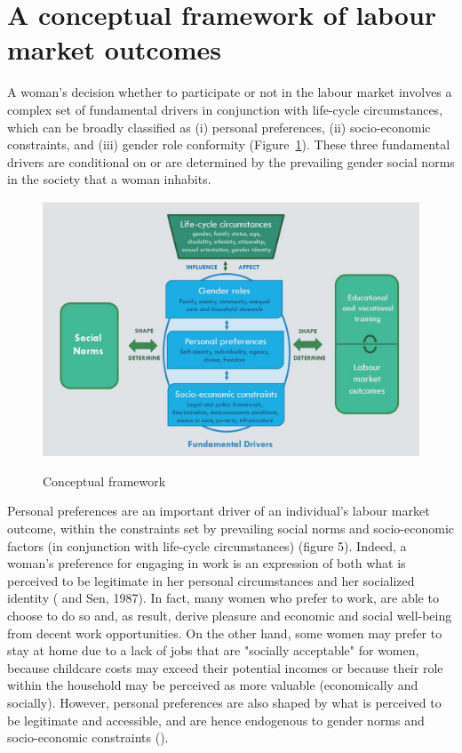 \section{A conceptual framework of labour market outcomes}\label{sec:framework}
A woman's decision whether to participate or not in the labour market involves a complex set of fundamental drivers in conjunction with life-cycle circumstances, which can be broadly classified as (i) personal preferences, (ii) socio-economic constraints, and (iii) gender role conformity (Figure~\ref{fig:framework}). These three fundamental drivers are conditional on or are determined by the prevailing gender social norms in the society that a woman inhabits.

\begin{figure}[htb]
	\centering
	\caption{Conceptual framework}
	\includegraphics[width=120mm,keepaspectratio,height=0.6\textheight]{Figures/framework_1}
	\label{fig:framework}
\end{figure}

Personal preferences are an important driver of an individual's labour market outcome, within the constraints set by prevailing social norms and socio-economic factors (in conjunction with life-cycle circumstances) (figure 5). Indeed, a woman's preference for engaging in work is an expression of both what is perceived to be legitimate in her personal circumstances and her socialized identity (\cite{ilogallup2017} and Sen, 1987). In fact, many women who prefer to work, are able to choose to do so and, as result, derive pleasure and economic and social well-being from decent work opportunities. On the other hand, some women may prefer to stay at home due to a lack of jobs that are "socially acceptable" for women, because childcare costs may exceed their potential incomes or because their role within the household may be perceived as more valuable (economically and socially). However, personal preferences are also shaped by what is perceived to be legitimate and accessible, and are hence endogenous to gender norms and socio-economic constraints (\citet*{sen1995agency}).
 
